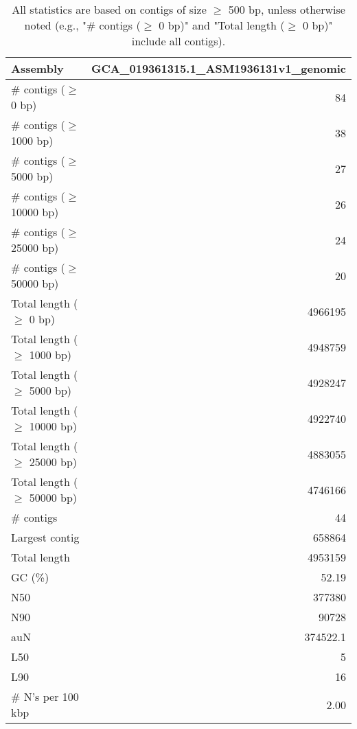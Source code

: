 \documentclass[12pt,a4paper]{article}
\begin{document}
\begin{table}[ht]
\begin{center}
\caption{All statistics are based on contigs of size $\geq$ 500 bp, unless otherwise noted (e.g., "\# contigs ($\geq$ 0 bp)" and "Total length ($\geq$ 0 bp)" include all contigs).}
\begin{tabular}{|l*{1}{|r}|}
\hline
Assembly & GCA\_019361315.1\_ASM1936131v1\_genomic \\ \hline
\# contigs ($\geq$ 0 bp) & 84 \\ \hline
\# contigs ($\geq$ 1000 bp) & 38 \\ \hline
\# contigs ($\geq$ 5000 bp) & 27 \\ \hline
\# contigs ($\geq$ 10000 bp) & 26 \\ \hline
\# contigs ($\geq$ 25000 bp) & 24 \\ \hline
\# contigs ($\geq$ 50000 bp) & 20 \\ \hline
Total length ($\geq$ 0 bp) & 4966195 \\ \hline
Total length ($\geq$ 1000 bp) & 4948759 \\ \hline
Total length ($\geq$ 5000 bp) & 4928247 \\ \hline
Total length ($\geq$ 10000 bp) & 4922740 \\ \hline
Total length ($\geq$ 25000 bp) & 4883055 \\ \hline
Total length ($\geq$ 50000 bp) & 4746166 \\ \hline
\# contigs & 44 \\ \hline
Largest contig & 658864 \\ \hline
Total length & 4953159 \\ \hline
GC (\%) & 52.19 \\ \hline
N50 & 377380 \\ \hline
N90 & 90728 \\ \hline
auN & 374522.1 \\ \hline
L50 & 5 \\ \hline
L90 & 16 \\ \hline
\# N's per 100 kbp & 2.00 \\ \hline
\end{tabular}
\end{center}
\end{table}
\end{document}
